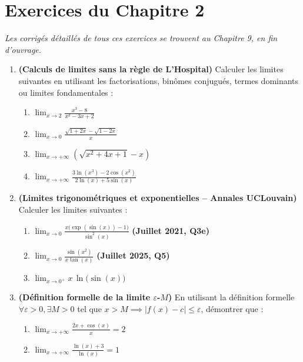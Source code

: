 \section{Exercices du Chapitre 2}

\emph{Les corrigés détaillés de tous ces exercices se trouvent au Chapitre 9, en fin d'ouvrage.}

\begin{enumerate}[label=\textbf{Exercice 2.\arabic* --}]
    \item \textbf{(Calculs de limites sans la règle de L'Hospital)} Calculer les limites suivantes en utilisant les factorisations, binômes conjugués, termes dominants ou limites fondamentales :
    \begin{enumerate}
        \item $\displaystyle \lim_{x \to 2} \frac{x^3 - 8}{x^2 - 3x + 2}$
        \item $\displaystyle \lim_{x \to 0} \frac{\sqrt{1 + 2x} - \sqrt{1 - 2x}}{x}$
        \item $\displaystyle \lim_{x \to +\infty} \left(\sqrt{x^2 + 4x + 1} - x\right)$
        \item $\displaystyle \lim_{x \to +\infty} \frac{3\ln(x^3) - 2\cos(x^2)}{2\ln(x) + 5\sin(x)}$
    \end{enumerate}

    \item \textbf{(Limites trigonométriques et exponentielles -- Annales UCLouvain)} Calculer les limites suivantes :
    \begin{enumerate}
        \item $\displaystyle \lim_{x \to 0} \frac{x\bigl(\exp(\sin(x)) - 1\bigr)}{\sin^2(x)}$ \quad \textbf{(Juillet 2021, Q3e)}
        \item $\displaystyle \lim_{x \to 0} \frac{\sin(x^2)}{x\tan(x)}$ \quad \textbf{(Juillet 2025, Q5)}
        \item $\displaystyle \lim_{x \to 0^+} x\,\ln\bigl(\sin(x)\bigr)$
    \end{enumerate}

    \item \textbf{(Définition formelle de la limite $\varepsilon$-$M$)} En utilisant la définition formelle $\forall \varepsilon > 0, \exists M > 0$ tel que $x > M \implies |f(x) - c| \le \varepsilon$, démontrer que :
    \begin{enumerate}
        \item $\displaystyle \lim_{x \to +\infty} \frac{2x + \cos(x)}{x} = 2$
        \item $\displaystyle \lim_{x \to +\infty} \frac{\ln(x) + 3}{\ln(x)} = 1$
    \end{enumerate}


\end{enumerate}
